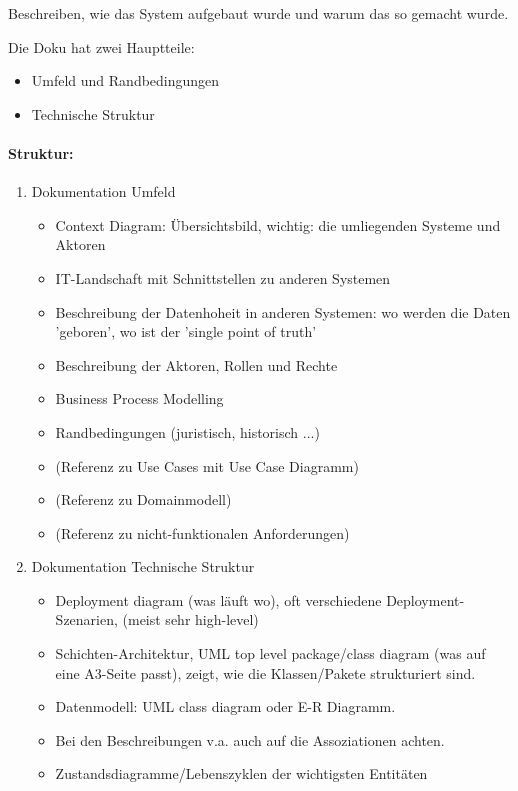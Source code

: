 Beschreiben, wie das System aufgebaut wurde und warum das so gemacht wurde.

Die Doku hat zwei Hauptteile:
\begin{itemize}
	\item Umfeld und Randbedingungen
	\item Technische Struktur
\end{itemize}

\paragraph{Struktur:}

\begin{enumerate}
	\item Dokumentation Umfeld
		\begin{itemize}
			\item Context Diagram: Übersichtsbild, wichtig: die umliegenden Systeme und Aktoren
			\item IT-Landschaft mit Schnittstellen zu anderen Systemen
			\item Beschreibung der Datenhoheit in anderen Systemen: wo werden die Daten 'geboren', wo ist der 'single point of truth'
			\item Beschreibung der Aktoren, Rollen und Rechte
			\item Business Process Modelling
			\item Randbedingungen (juristisch, historisch ...)
			\item (Referenz zu Use Cases mit Use Case Diagramm)
			\item (Referenz zu Domainmodell)
			\item (Referenz zu nicht-funktionalen Anforderungen)
		\end{itemize}
	\item Dokumentation Technische Struktur
		\begin{itemize}
			\item Deployment diagram (was läuft wo), oft verschiedene Deployment-Szenarien, (meist sehr high-level)
			\item Schichten-Architektur, UML top level package/class diagram (was auf eine A3-Seite passt), zeigt, wie die Klassen/Pakete strukturiert sind.
			\item Datenmodell: UML class diagram oder E-R Diagramm.
			\item Bei den Beschreibungen v.a. auch auf die Assoziationen achten.
			\item Zustandsdiagramme/Lebenszyklen der wichtigsten Entitäten

\end{itemize}
\end{enumerate}

